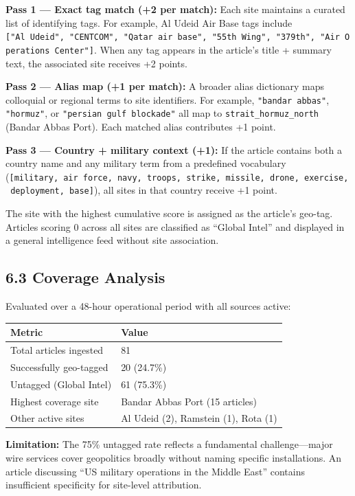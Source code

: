 \documentclass[11pt,a4paper]{article}
\begin{document}
\textbf{Pass 1 --- Exact tag match (+2 per match):}
Each site maintains a curated list of identifying tags. For example, Al Udeid Air Base tags include \texttt{{[}"Al\ Udeid",\ "CENTCOM",\ "Qatar\ air\ base",\ "55th\ Wing",\ "379th",\ "Air\ Operations\ Center"{]}}. When any tag appears in the article's title + summary text, the associated site receives +2 points.

\textbf{Pass 2 --- Alias map (+1 per match):}
A broader alias dictionary maps colloquial or regional terms to site identifiers. For example, \texttt{"bandar\ abbas"}, \texttt{"hormuz"}, or \texttt{"persian\ gulf\ blockade"} all map to \texttt{strait\_hormuz\_north} (Bandar Abbas Port). Each matched alias contributes +1 point.

\textbf{Pass 3 --- Country + military context (+1):}
If the article contains both a country name and any military term from a predefined vocabulary (\texttt{{[}military,\ air\ force,\ navy,\ troops,\ strike,\ missile,\ drone,\ exercise,\ deployment,\ base{]}}), all sites in that country receive +1 point.

The site with the highest cumulative score is assigned as the article's geo-tag. Articles scoring 0 across all sites are classified as ``Global Intel'' and displayed in a general intelligence feed without site association.

\hypertarget{coverage-analysis}{%
\subsection{6.3 Coverage Analysis}\label{coverage-analysis}}

Evaluated over a 48-hour operational period with all sources active:

\begin{longtable}[]{@{}ll@{}}
\toprule\noalign{}
Metric & Value \\
\midrule\noalign{}
\endhead
\bottomrule\noalign{}
\endlastfoot
Total articles ingested & 81 \\
Successfully geo-tagged & 20 (24.7\%) \\
Untagged (Global Intel) & 61 (75.3\%) \\
Highest coverage site & Bandar Abbas Port (15 articles) \\
Other active sites & Al Udeid (2), Ramstein (1), Rota (1) \\
\end{longtable}

\textbf{Limitation:} The 75\% untagged rate reflects a fundamental challenge---major wire services cover geopolitics broadly without naming specific installations. An article discussing ``US military operations in the Middle East'' contains insufficient specificity for site-level attribution.
\end{document}
